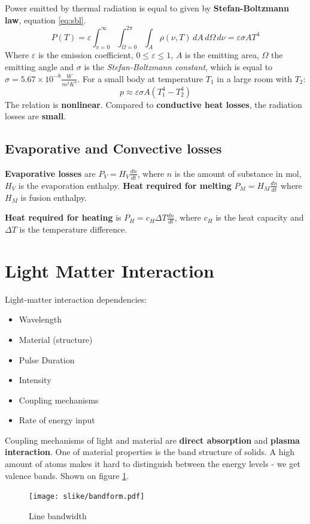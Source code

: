 Power emitted by thermal radiation is equal to given by \textbf{Stefan-Boltzmann law}, equation \ref{eq:sbl}.
\begin{equation}
    P(T) = \varepsilon \int_{v=0}^{\infty} \int_{\Omega = 0}^{2\pi} \int_{A} \rho(\nu,T)\, dA\, d\Omega \, d\nu = \varepsilon \sigma A T^4
    \label{eq:sbl}
\end{equation}
Where $\varepsilon$ is the emission coefficient, $0 \le \varepsilon \le 1$, $A$ is the emitting area,
$\Omega$ the emitting angle and $\sigma$ is the \textit{Stefan-Boltzmann constant}, which is equal to 
$\sigma = 5.67 \times 10^{-8} \frac{W}{m^2 K^4}$. 
For a small body at temperature $T_1$ in a large room with $T_2$:
\begin{equation}
    p \approx \varepsilon \sigma A (T_{1}^4 - T_2^{4})
\end{equation}
The relation is \textbf{nonlinear}. Compared to \textbf{conductive heat losses}, the radiation losses are \textbf{small}.

\subsection{Evaporative and Convective losses}
\textbf{Evaporative losses} are $P_V = H_V \frac{dn}{dt}$, where $n$ is the amount of substance in mol, $H_V$ is the evaporation enthalpy.
\textbf{Heat required for melting} $P_M = H_M \frac{dn}{dt}$ where $H_M$ is fusion enthalpy.

\textbf{Heat required for heating} is $P_H = c_H \Delta T \frac{dn}{dt}$, where $c_H$ is the heat capacity and $\Delta T$ is the temperature difference.


\section{Light Matter Interaction}
Light-matter interaction dependencies:
\begin{itemize}
    \item Wavelength
    \item Material (structure)
    \item Pulse Duration
    \item Intensity
    \item Coupling mechanisms
    \item Rate of energy input
\end{itemize}

Coupling mechanisms of light and material are \textbf{direct absorption} and \textbf{plasma interaction}.
One of material properties is the band structure of solids.  A high amount of atoms makes it hard to distinguish 
between the energy levels  - we get valence bands. Shown on figure \ref{fig:vbonds}.
\begin{figure}[h!]
    \centering
    \texttt{[image: slike/bandform.pdf]}
    \caption{Line bandwidth}
    \label{fig:vbonds}
\end{figure}

